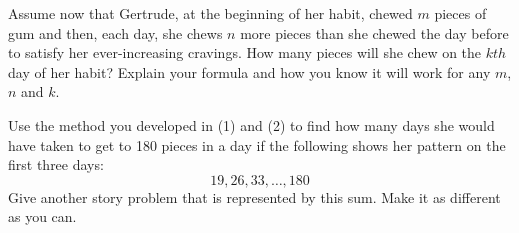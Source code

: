 \documentclass{ximera}
\begin{document}

\begin{problem}
Assume now that Gertrude, at the beginning of her habit, chewed $m$
pieces of gum and then, each day, she chews $n$ more pieces than she
chewed the day before to satisfy her ever-increasing cravings.  How many pieces will she chew on the $kth$
  day of her habit? Explain your formula and how you know it will work for any $m$, $n$ and $k$.  
\end{problem}

\begin{problem}
Use the method you developed in (1) and (2) to find how many days she would have taken to get to 180 pieces in a day if the following shows her pattern on the first three days:
\[
19, 26, 33, \dots , 180
\]
Give another story problem that is represented by this sum.  Make it as different as you can.
\end{problem}
\end{document}
